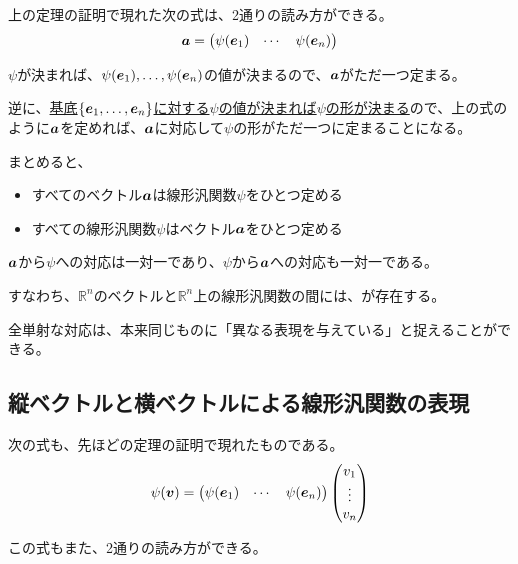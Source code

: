 \documentclass[../../../topic_linear-algebra]{subfiles}
\begin{document}
上の定理の証明で現れた次の式は、2通りの読み方ができる。
\begin{equation*}
  \vb*{a} = \begin{pmatrix}
    \psi(\vb*{e}_1) & \cdots & \psi(\vb*{e}_n)
  \end{pmatrix}
\end{equation*}

$\psi$が決まれば、$\psi(\vb*{e}_1), \ldots, \psi(\vb*{e}_n)$の値が決まるので、$\vb*{a}$がただ一つ定まる。

逆に、\hyperref[thm:linear-map-equality-on-basis]{基底$\{\vb*{e}_1, \ldots, \vb*{e}_n\}$に対する$\psi$の値が決まれば$\psi$の形が決まる}ので、上の式のように$\vb*{a}$を定めれば、$\vb*{a}$に対応して$\psi$の形がただ一つに定まることになる。

\br

まとめると、
\begin{itemize}
  \item すべてのベクトル$\vb*{a}$は線形汎関数$\psi$をひとつ定める
  \item すべての線形汎関数$\psi$はベクトル$\vb*{a}$をひとつ定める
\end{itemize}

$\vb*{a}$から$\psi$への対応は一対一であり、$\psi$から$\vb*{a}$への対応も一対一である。

すなわち、$\mathbb{R}^n$のベクトルと$\mathbb{R}^n$上の線形汎関数の間には、が存在する。

\br

全単射な対応は、本来同じものに「異なる表現を与えている」と捉えることができる。

\subsection{縦ベクトルと横ベクトルによる線形汎関数の表現}\label{sec:column-row-functional}

次の式も、先ほどの定理の証明で現れたものである。
\begin{equation*}
  \psi(\vb*{v}) = \begin{pmatrix}
    \psi(\vb*{e}_1) & \cdots & \psi(\vb*{e}_n)
  \end{pmatrix} \begin{pmatrix}
    v_1 \\
    \vdots \\
    v_n
  \end{pmatrix}
\end{equation*}

この式もまた、2通りの読み方ができる。
\end{document}
